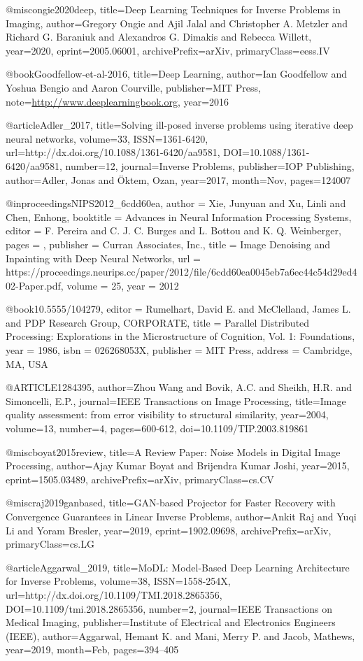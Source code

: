 @misc{ongie2020deep,
      title={Deep Learning Techniques for Inverse Problems in Imaging}, 
      author={Gregory Ongie and Ajil Jalal and Christopher A. Metzler and Richard G. Baraniuk and Alexandros G. Dimakis and Rebecca Willett},
      year={2020},
      eprint={2005.06001},
      archivePrefix={arXiv},
      primaryClass={eess.IV}
}

@book{Goodfellow-et-al-2016,
    title={Deep Learning},
    author={Ian Goodfellow and Yoshua Bengio and Aaron Courville},
    publisher={MIT Press},
    note={\url{http://www.deeplearningbook.org}},
    year={2016}
}

@article{Adler_2017,
	title={Solving ill-posed inverse problems using iterative deep neural networks},
	volume={33},
	ISSN={1361-6420},
	url={http://dx.doi.org/10.1088/1361-6420/aa9581},
	DOI={10.1088/1361-6420/aa9581},
	number={12},
	journal={Inverse Problems},
	publisher={IOP Publishing},
	author={Adler, Jonas and Öktem, Ozan},
	year={2017},
	month={Nov},
	pages={124007}
}

@inproceedings{NIPS2012_6cdd60ea,
	author = {Xie, Junyuan and Xu, Linli and Chen, Enhong},
	booktitle = {Advances in Neural Information Processing Systems},
	editor = {F. Pereira and C. J. C. Burges and L. Bottou and K. Q. Weinberger},
	pages = {},
	publisher = {Curran Associates, Inc.},
	title = {Image Denoising and Inpainting with Deep Neural Networks},
	url = {https://proceedings.neurips.cc/paper/2012/file/6cdd60ea0045eb7a6ec44c54d29ed402-Paper.pdf},
	volume = {25},
	year = {2012}
}

@book{10.5555/104279,
	editor = {Rumelhart, David E. and McClelland, James L. and PDP Research Group, CORPORATE},
	title = {Parallel Distributed Processing: Explorations in the Microstructure of Cognition, Vol. 1: Foundations},
	year = {1986},
	isbn = {026268053X},
	publisher = {MIT Press},
	address = {Cambridge, MA, USA}
}

@ARTICLE{1284395,
	author={Zhou Wang and Bovik, A.C. and Sheikh, H.R. and Simoncelli, E.P.},
	journal={IEEE Transactions on Image Processing}, 
	title={Image quality assessment: from error visibility to structural similarity}, 
	year={2004},
	volume={13},
	number={4},
	pages={600-612},
	doi={10.1109/TIP.2003.819861}}

@misc{boyat2015review,
	title={A Review Paper: Noise Models in Digital Image Processing}, 
	author={Ajay Kumar Boyat and Brijendra Kumar Joshi},
	year={2015},
	eprint={1505.03489},
	archivePrefix={arXiv},
	primaryClass={cs.CV}
}

@misc{raj2019ganbased,
	title={GAN-based Projector for Faster Recovery with Convergence Guarantees in Linear Inverse Problems}, 
	author={Ankit Raj and Yuqi Li and Yoram Bresler},
	year={2019},
	eprint={1902.09698},
	archivePrefix={arXiv},
	primaryClass={cs.LG}
}

@article{Aggarwal_2019,
	title={MoDL: Model-Based Deep Learning Architecture for Inverse Problems},
	volume={38},
	ISSN={1558-254X},
	url={http://dx.doi.org/10.1109/TMI.2018.2865356},
	DOI={10.1109/tmi.2018.2865356},
	number={2},
	journal={IEEE Transactions on Medical Imaging},
	publisher={Institute of Electrical and Electronics Engineers (IEEE)},
	author={Aggarwal, Hemant K. and Mani, Merry P. and Jacob, Mathews},
	year={2019},
	month={Feb},
	pages={394–405}
}
